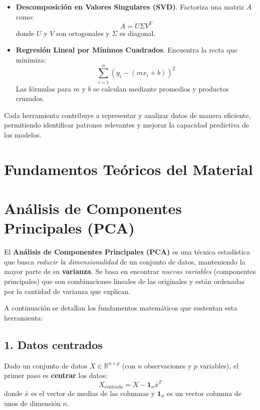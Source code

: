 \documentclass[12pt]{article}
\begin{document}
\begin{itemize}
                \item \textbf{Descomposición en Valores Singulares (SVD)}. Factoriza una matriz $A$ como:
                \[
                A = U \Sigma V^T
                \]
                donde $U$ y $V$ son ortogonales y $\Sigma$ es diagonal.
                
                \item \textbf{Regresión Lineal por Mínimos Cuadrados}. Encuentra la recta que minimiza:
                \[
                \sum_{i=1}^n (y_i - (m x_i + b))^2
                \]
                Las fórmulas para $m$ y $b$ se calculan mediante promedios y productos cruzados.
        \end{itemize}
        
        \vspace{1em}
        \noindent
        Cada herramienta contribuye a representar y analizar datos de manera eficiente, permitiendo identificar patrones relevantes y mejorar la capacidad predictiva de los modelos.
        
        \section{Fundamentos Teóricos del Material}
        \section*{Análisis de Componentes Principales (PCA)}
        \noindent
        El \textbf{Análisis de Componentes Principales (PCA)} es una técnica estadística que busca \emph{reducir la dimensionalidad} de un conjunto de datos, manteniendo la mayor parte de su \textbf{varianza}. Se basa en encontrar \emph{nuevas variables} (componentes principales) que son combinaciones lineales de las originales y están ordenadas por la cantidad de varianza que explican.
        
        \vspace{1em}
        \noindent
        A continuación se detallan los fundamentos matemáticos que sustentan esta herramienta:
        
        \subsection*{1. Datos centrados}
        
        Dado un conjunto de datos $ X \in \mathbb{R}^{n \times p} $ (con $ n $ observaciones y $ p $ variables), el primer paso es \textbf{centrar} los datos:
        \[
        X_{\text{centrado}} = X - \mathbf{1}_n \bar{x}^T
        \]
        donde $\bar{x}$ es el vector de medias de las columnas y $\mathbf{1}_n$ es un vector columna de unos de dimensión $ n $.
        
\end{document}
